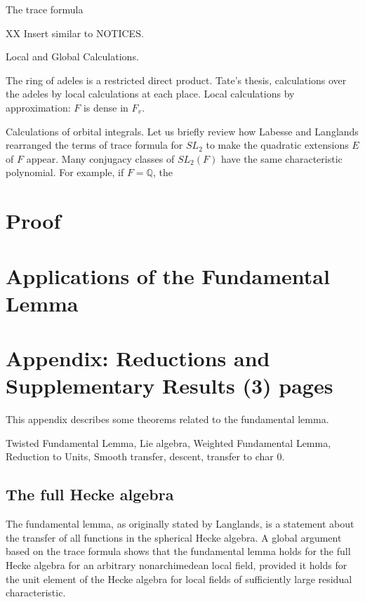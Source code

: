 \documentclass[brochure,english,12pt]{bourbaki}
\newcommand{\ring}[1]{\mathbb{#1}}
\begin{document}
The trace formula

XX Insert similar to NOTICES.

Local and Global Calculations.

The ring of adeles is a restricted direct product.  Tate's thesis,
calculations over the adeles by local calculations at each place.
Local calculations by approximation: $F$ is dense in $F_v$.


Calculations of orbital integrals.  Let us briefly review how Labesse and Langlands rearranged the terms of trace formula for $SL_2$ to make the quadratic extensions $E$ of $F$ appear.  Many conjugacy classes of $SL_2(F)$ have the same characteristic polynomial.  For example, if $F=\ring{Q}$,
the 

\section{Proof} %

\section{Applications of the Fundamental Lemma}  




\section{Appendix: Reductions and Supplementary Results (3) pages}



This appendix describes some theorems related to the fundamental lemma.

Twisted Fundamental Lemma, Lie algebra, Weighted Fundamental Lemma, Reduction to Units, Smooth transfer, descent, transfer to char 0.

\subsection{The full Hecke algebra}

The fundamental lemma, as originally stated by Langlands, is a statement
about the transfer of all functions in the spherical Hecke algebra.
A global argument based on the trace formula shows that the fundamental
lemma holds
for the full Hecke algebra for an arbitrary nonarchimedean local
field, provided it holds for the unit element of the Hecke algebra for
local fields of sufficiently large residual characteristic.
\end{document}

